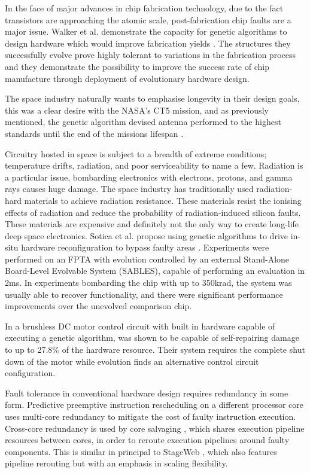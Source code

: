 In the face of major advances in chip fabrication technology, due to the fact transistors
are
approaching the atomic scale, post-fabrication chip faults are a major issue. Walker et al.
demonstrate the capacity for genetic algorithms to design hardware which would
improve fabrication yields \cite{10.1007/978-3-540-85857-7_27}. The structures
they successfully evolve prove highly tolerant to variations in the fabrication process
and they demonstrate the possibility to improve the success rate of chip manufacture
through deployment of evolutionary hardware design.

The space industry naturally wants to emphasise longevity in their design goals,
this was a clear desire with the NASA's CT5 mission, and as previously mentioned,
the genetic algorithm devised antenna performed to the highest standards until the
end of the missions lifespan \cite{Antenna}.

Circuitry hosted in space is subject to a breadth of extreme conditions; temperature
drifts, radiation, and poor serviceability to name a few. Radiation is a particular
issue, bombarding electronics with electrons, protons, and gamma rays causes huge damage.
The space industry has traditionally used radiation-hard materials to achieve
radiation resistance. These materials resist the ionising effects of radiation
and reduce the probability of radiation-induced silicon faults. These materials
are expensive and definitely not the only way to create long-life deep space
electronics. Sotica et al. propose using genetic algorithms to drive
in-situ hardware reconfiguration to bypass faulty areas \cite{1331112}. Experiments
were performed on an FPTA with evolution controlled by an external Stand-Alone
Board-Level Evolvable System (SABLES), capable of performing an evaluation in 2ms.
In experiments bombarding the chip with up to 350krad, the system was usually able
to recover functionality, and there were significant performance improvements over
the unevolved comparison chip.

In \cite{8046381} a brushless DC motor control circuit with built in hardware capable of executing
a genetic algorithm, was shown to be capable of self-repairing damage to up to 27.8\%
of the hardware resource. Their system requires the complete shut down of the motor while
evolution finds an alternative control circuit configuration.

Fault tolerance in conventional hardware design requires redundancy in some
form. Predictive preemptive instruction rescheduling on a different processor
core \cite{Soman} uses multi-core redundancy to mitigate the cost of faulty instruction
execution. Cross-core redundancy is used by core salvaging \cite{Powell}, which shares execution
pipeline resources between cores, in order to reroute execution pipelines
around faulty components. This is similar in principal to StageWeb \cite{StageWeb}, which also
features pipeline rerouting but with an emphasis in scaling flexibility.

